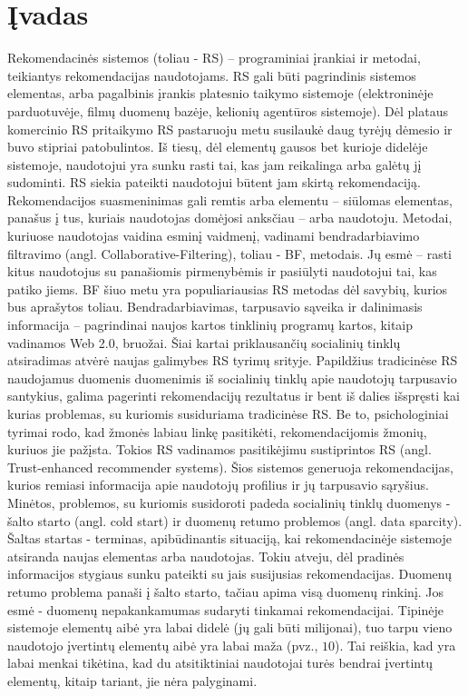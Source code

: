 \documentclass{VUMIFInfMagistrinis}
\begin{document}
\section{Įvadas}
\linespread{1.5}
\selectfont
Rekomendacinės sistemos (toliau - RS) – programiniai įrankiai ir metodai, teikiantys rekomendacijas naudotojams. RS gali būti pagrindinis sistemos elementas,  arba pagalbinis įrankis platesnio taikymo sistemoje (elektroninėje parduotuvėje, filmų duomenų bazėje, kelionių agentūros sistemoje). Dėl plataus komercinio RS pritaikymo RS pastaruoju metu susilaukė daug tyrėjų dėmesio ir buvo stipriai patobulintos. 
\newline
\indent
Iš tiesų, dėl elementų gausos bet kurioje didelėje sistemoje, naudotojui yra sunku rasti tai, kas jam reikalinga arba galėtų jį sudominti. RS siekia pateikti naudotojui būtent jam skirtą rekomendaciją. Rekomendacijos suasmeninimas gali remtis arba elementu – siūlomas elementas, panašus į tus, kuriais naudotojas domėjosi anksčiau – arba naudotoju. Metodai, kuriuose naudotojas vaidina esminį vaidmenį, vadinami bendradarbiavimo filtravimo (angl. Collaborative-Filtering), toliau - BF, metodais. Jų esmė – rasti kitus naudotojus su panašiomis pirmenybėmis ir pasiūlyti naudotojui tai, kas patiko jiems. BF šiuo metu yra populiariausias RS metodas dėl savybių, kurios bus aprašytos toliau.
\newline
\indent
Bendradarbiavimas, tarpusavio sąveika ir dalinimasis informacija – pagrindinai naujos kartos tinklinių programų kartos, kitaip vadinamos Web 2.0, bruožai. Šiai kartai priklausančių socialinių tinklų atsiradimas atvėrė naujas galimybes RS tyrimų srityje. Papildžius tradicinėse RS naudojamus duomenis duomenimis iš socialinių tinklų apie naudotojų tarpusavio santykius, galima pagerinti rekomendacijų rezultatus ir bent iš dalies išspręsti kai kurias problemas, su kuriomis susiduriama tradicinėse RS. Be to, psichologiniai tyrimai rodo, kad žmonės labiau linkę pasitikėti, rekomendacijomis žmonių, kuriuos jie pažįsta. Tokios RS vadinamos pasitikėjimu sustiprintos RS (angl. Trust-enhanced recommender systems). Šios sistemos generuoja rekomendacijas, kurios remiasi informacija apie naudotojų profilius ir jų tarpusavio sąryšius. Minėtos, problemos, su kuriomis susidoroti padeda socialinių tinklų duomenys - šalto starto (angl. cold start) ir duomenų retumo problemos (angl. data sparcity). Šaltas startas - terminas, apibūdinantis situaciją, kai rekomendacinėje sistemoje atsiranda naujas elementas arba naudotojas. Tokiu atveju, dėl pradinės informacijos stygiaus sunku pateikti su jais susijusias rekomendacijas. Duomenų retumo problema panaši į šalto starto, tačiau apima visą duomenų rinkinį. Jos esmė - duomenų nepakankamumas sudaryti tinkamai rekomendacijai. Tipinėje sistemoje elementų aibė yra labai didelė (jų gali būti milijonai), tuo tarpu vieno naudotojo įvertintų elementų aibė yra labai maža (pvz., $10$). Tai reiškia, kad yra labai menkai tikėtina, kad du atsitiktiniai naudotojai turės bendrai įvertintų elementų, kitaip tariant, jie nėra palyginami.
\end{document}
